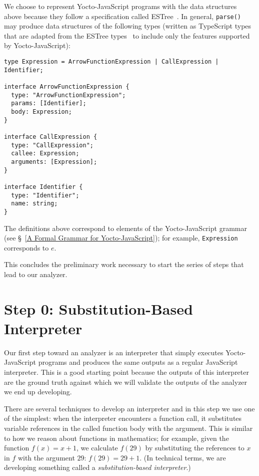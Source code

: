 \documentclass[12pt, oneside]{book}
\begin{document}
We choose to represent Yocto-JavaScript programs with the data structures above because they follow a specification called ESTree~\cite{estree}. In general, \texttt{parse()} may produce data structures of the following types (written as TypeScript types that are adapted from the ESTree types~\cite{estree-types} to include only the features supported by Yocto-JavaScript):

\begin{verbatim}
type Expression = ArrowFunctionExpression | CallExpression | Identifier;

interface ArrowFunctionExpression {
  type: "ArrowFunctionExpression";
  params: [Identifier];
  body: Expression;
}

interface CallExpression {
  type: "CallExpression";
  callee: Expression;
  arguments: [Expression];
}

interface Identifier {
  type: "Identifier";
  name: string;
}
\end{verbatim}

The definitions above correspond to elements of the Yocto-JavaScript grammar (see §~\ref{A Formal Grammar for Yocto-JavaScript}); for example, \texttt{Expression} corresponds to $e$.

This concludes the preliminary work necessary to start the series of steps that lead to our analyzer.

\section{Step 0: Substitution-Based Interpreter}
\label{Step 0: Substitution-Based Interpreter}

Our first step toward an analyzer is an interpreter that simply executes Yocto-JavaScript programs and produces the same outputs as a regular JavaScript interpreter. This is a good starting point because the outputs of this interpreter are the ground truth against which we will validate the outputs of the analyzer we end up developing.

There are several techniques to develop an interpreter and in this step we use one of the simplest: when the interpreter encounters a function call, it substitutes variable references in the called function body with the argument. This is similar to how we reason about functions in mathematics; for example, given the function $f(x) = x + 1$, we calculate $f(29)$ by substituting the references to $x$ in $f$ with the argument $29$: $f(29) = 29 + 1$. (In technical terms, we are developing something called a \emph{substitution-based interpreter}.)
\end{document}
